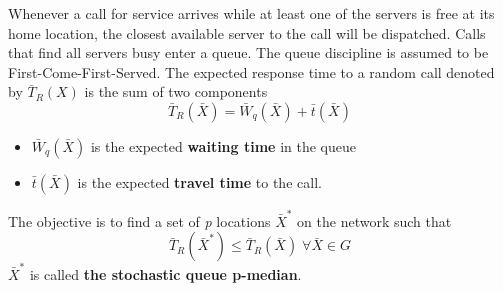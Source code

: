 Whenever a call for service arrives 
while at least one of the servers
is free at its home location,
the closest available server to the call
will be dispatched.
Calls that find
all servers busy
enter a queue.
The queue discipline is assumed to be
First-Come-First-Served.
The expected response time
to a random call
denoted by $\bar{T}_R(X)$
is the sum of two components
\begin{equation*}
  \bar{T}_R(\bar{X}) = \bar{W}_q(\bar{X})+\bar{t}(\bar{X})
\end{equation*}
\begin{itemize}
\item $\bar{W}_q(\bar{X})$ is the expected \textbf{waiting time} in the queue
\item $\bar{t}(\bar{X})$ is the expected \textbf{travel time} to the call.
\end{itemize}
The objective is to find
a set of \textit{p} locations $\bar{X}^*$
on the network
such that
\begin{equation*}
  \bar{T}_R(\bar{X}^*) \leq \bar{T}_R(\bar{X}) \; \forall \bar{X} \in G
\end{equation*}
$\bar{X}^*$ is called \textbf{the stochastic queue p-median}.
